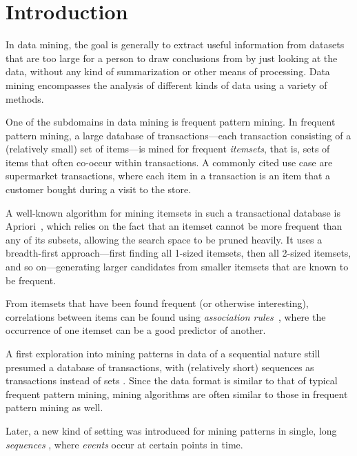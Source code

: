 \chapter{Introduction}

In data mining, the goal is generally to extract useful information from datasets that are too large for a person to draw conclusions from by just looking at the data, without any kind of summarization or other means of processing. Data mining encompasses the analysis of different kinds of data using a variety of methods.


One of the subdomains in data mining is frequent pattern mining. In frequent pattern mining, a large database of transactions---each transaction consisting of a (relatively small) set of items---is mined for frequent \emph{itemsets}, that is, sets of items that often co-occur within transactions. A commonly cited use case are supermarket transactions, where each item in a transaction is an item that a customer bought during a visit to the store.

A well-known algorithm for mining itemsets in such a transactional database is Apriori~\citep{agrawal1994fast}, which relies on the fact that an itemset cannot be more frequent than any of its subsets, allowing the search space to be pruned heavily. It uses a breadth-first approach---first finding all 1-sized itemsets, then all 2-sized itemsets, and so on---generating larger candidates from smaller itemsets that are known to be frequent.

From itemsets that have been found frequent (or otherwise interesting), correlations between items can be found using \emph{association rules~\cite{agrawal1994fast}}, where the occurrence of one itemset can be a good predictor of another.


A first exploration into mining patterns in data of a sequential nature still presumed a database of transactions, with (relatively short) sequences as transactions instead of sets \citep{agrawal1995mining}.
Since the data format is similar to that of typical frequent pattern mining, mining algorithms are often similar to those in frequent pattern mining as well.


Later, a new kind of setting was introduced for mining patterns in single, long \emph{sequences} \citep{mannila1997discovery}, where \emph{events} occur at certain points in time.

